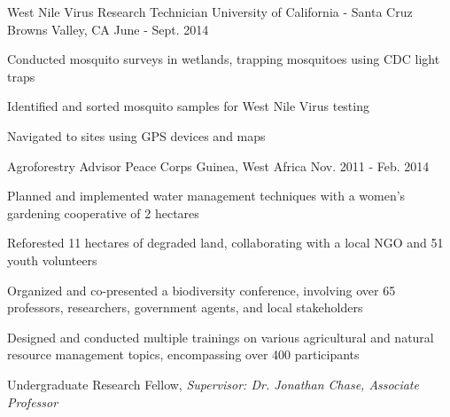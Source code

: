

\begin{cventries}

  \cventry
    {West Nile Virus Research Technician} %
    {University of California - Santa Cruz} %
    {Browns Valley, CA} %
    {June - Sept. 2014} %
    {
      \begin{cvitems} %
        \item {Conducted mosquito surveys in wetlands, trapping mosquitoes using CDC light traps}
        \item {Identified and sorted mosquito samples for West Nile Virus testing}
        \item {Navigated to sites using GPS devices and maps}
      \end{cvitems}
    }
\medskip
  \cventry
    {Agroforestry Advisor} %
    {Peace Corps} %
    {Guinea, West Africa} %
    {Nov. 2011 - Feb. 2014} %
    {
      \begin{cvitems} %
        \item {Planned and implemented water management techniques with a women's gardening cooperative of 2 hectares}
        \item {Reforested 11 hectares of degraded land, collaborating with a local NGO and 51 youth volunteers}
        \item {Organized and co-presented a biodiversity conference, involving over 65 professors, researchers, government agents, and local stakeholders}
        \item {Designed and conducted multiple trainings on various agricultural and natural resource management topics, encompassing over 400 participants}
      \end{cvitems}
    }
\medskip
  \cventry
    {Undergraduate Research Fellow, \textit{Supervisor: Dr. Jonathan Chase, Associate Professor}} %

\end{cventries}

